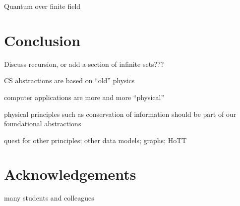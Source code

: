 \documentclass{article}
\begin{document}
Quantum over finite field 

\section{Conclusion}

Discuss recursion, or add a section of infinite sets???

CS abstractions are based on ``old'' physics

computer applications are more and more ``physical''

physical principles such as conservation of information should be part
of our foundational abstractions

quest for other principles; other data models; graphs; HoTT

\section*{Acknowledgements} many students and colleagues 



\end{document}
